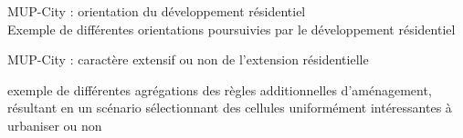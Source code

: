 \documentclass[xcolor=table]{beamer}
\begin{document}
\begin{frame}{MUP-City : orientation du développement résidentiel}
\vspace{1cm}
\\
{\footnotesize Exemple de différentes orientations poursuivies par le développement résidentiel}%
\end{frame}


\begin{frame}{MUP-City : caractère extensif ou non de l'extension résidentielle}
\vspace{1cm}

{\footnotesize exemple de différentes agrégations des règles additionnelles d'aménagement, résultant en un scénario sélectionnant des cellules uniformément intéressantes à urbaniser ou non}
\end{frame}
\end{document}
